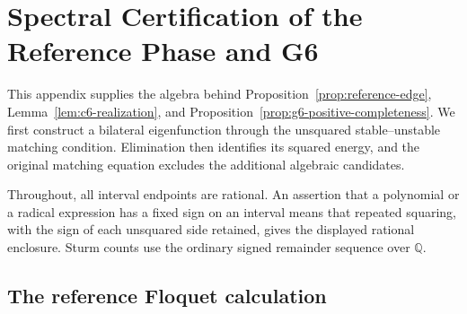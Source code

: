 \section{Spectral Certification of the Reference Phase and G6}
\label{app:g6-certification}

This appendix supplies the algebra behind
Proposition~\ref{prop:reference-edge},
Lemma~\ref{lem:c6-realization}, and
Proposition~\ref{prop:g6-positive-completeness}. We first construct a
bilateral eigenfunction through the unsquared stable--unstable matching
condition. Elimination then identifies its squared energy, and the original
matching equation excludes the additional algebraic candidates.

Throughout, all interval endpoints are rational.  An assertion that a
polynomial or a radical expression has a fixed sign on an interval means
that repeated squaring, with the sign of each unsquared side retained,
gives the displayed rational enclosure.  Sturm counts use the ordinary
signed remainder sequence over \(\mathbb Q\).

\subsection{The reference Floquet calculation}
\label{appsubsec:reference-floquet}

